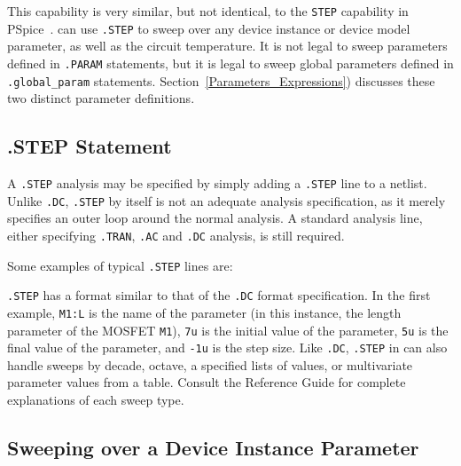 This capability is very similar, but not identical, to the \verb|STEP|
capability in PSpice~\cite{PSpiceUG:1998}.  \Xyce{} can use
\verb|.STEP| to sweep over any device instance or device model
parameter, as well as the circuit temperature.  It is not legal to
sweep parameters defined in \texttt{.PARAM} statements, but it is
legal to sweep global parameters defined in \texttt{.global\_param}
statements.  Section~\ref{Parameters_Expressions}) discusses these two
distinct parameter definitions.

\subsection{.STEP Statement}

A \verb|.STEP| analysis may be specified by simply adding a
\verb|.STEP| line to a netlist.  Unlike \verb|.DC|, \verb|.STEP| by
itself is not an adequate analysis specification, as it merely
specifies an outer loop around the normal analysis.  A standard
analysis line, either specifying \verb|.TRAN|, \verb|.AC| and
\verb|.DC| analysis, is still required.

Some examples of typical \verb|.STEP| lines are:


\verb|.STEP| has a format similar to that of the \verb|.DC| format
specification.  In the first example, \verb|M1:L| is the name of the
parameter (in this instance, the length parameter of the MOSFET
\texttt{M1}), \verb|7u| is the initial value of the parameter,
\verb|5u| is the final value of the parameter, and \verb|-1u| is the
step size.  Like \verb|.DC|, \verb|.STEP| in \Xyce{} can also handle
sweeps by decade, octave, a specified lists of values, or multivariate parameter values from a table.  Consult the
\Xyce{} Reference Guide\ReferenceGuide{} for complete explanations of each sweep type.

\subsection{Sweeping over a Device Instance Parameter}
\label{step_InstanceParam}

